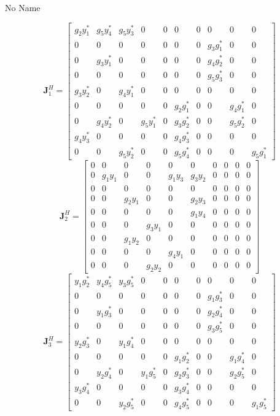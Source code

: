 \documentclass[a4paper,10pt]{article}
\begin{document}
\begin{section}{No Name}
\begin{landscape}
\begin{equation}
\boldsymbol{J}_1^H = 
\begin{bmatrix}
g_2y_1^*&g_5y_4^*&g_5y_3^*&0&0&0&0&0&0&0\\
0&0&0&0&0&0&0&g_3g_1^*&0&0\\
0&g_3y_1^*&0&0&0&0&0&g_4g_2^*&0&0\\
0&0&0&0&0&0&0&g_5g_3^*&0&0\\
g_3y_2^*&0&g_4y_1^*&0&0&0&0&0&0&0\\
0&0&0&0&0&g_2g_1^*&0&0&g_4g_1^*&0\\
0&g_4y_2^*&0&g_5y_1^*&0&g_3g_2^*&0&0&g_5g_2^*&0\\
g_4y_3^*&0&0&0&0&g_4g_3^*&0&0&0&0\\
0&0&g_5y_2^*&0&0&g_5g_4^*&0&0&0&g_5g_1^*
\end{bmatrix}
\end{equation}
\begin{equation}
\boldsymbol{J}_2^H = 
\begin{bmatrix}
0&0&0&0&0&0&0&0&0&0\\
0&g_1y_1&0&0&g_1y_3&g_3y_2&0&0&0&0\\
0&0&0&0&0&0&0&0&0&0\\
0&0&g_2y_1&0&0&g_2y_3&0&0&0&0\\
0&0&0&0&0&g_1y_4&0&0&0&0\\
0&0&0&g_3y_1&0&0&0&0&0&0\\
0&0&g_1y_2&0&0&0&0&0&0&0\\
0&0&0&0&g_4y_1&0&0&0&0&0\\
0&0&0&g_2y_2&0&0&0&0&0&0
\end{bmatrix}
\end{equation}
\begin{equation}
\boldsymbol{J}_3^H = 
\begin{bmatrix}
y_1g_2^*&y_4g_5^*&y_3g_5^*&0&0&0&0&0&0&0\\
0&0&0&0&0&0&0&g_1g_3^*&0&0\\
0&y_1g_3^*&0&0&0&0&0&g_2g_4^*&0&0\\
0&0&0&0&0&0&0&g_3g_5^*&0&0\\
y_2g_3^*&0&y_1g_4^*&0&0&0&0&0&0&0\\
0&0&0&0&0&g_1g_2^*&0&0&g_1g_4^*&0\\
0&y_2g_4^*&0&y_1g_5^*&0&g_2g_3^*&0&0&g_2g_5^*&0\\
y_3g_4^*&0&0&0&0&g_3g_4^*&0&0&0&0\\
0&0&y_2g_5^*&0&0&g_4g_5^*&0&0&0&g_1g_5^*
\end{bmatrix}

\end{equation}
\end{landscape}
\end{section}
\end{document}
